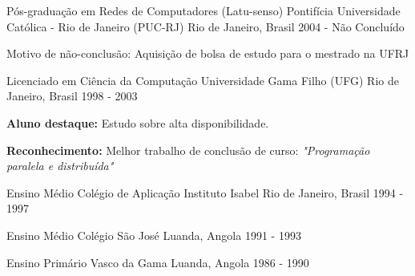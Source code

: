 \begin{cventries}

\cventry
{Pós-graduação em Redes de Computadores (Latu-senso)} %
{Pontifícia Universidade Católica - Rio de Janeiro (PUC-RJ)} %
{Rio de Janeiro, Brasil} %
{2004 - Não Concluído} %
{ %
\begin{cvitems}
    \item {Motivo de não-conclusão: Aquisição de bolsa de estudo para o mestrado na UFRJ}
\end{cvitems}
}


\cventry
{Licenciado em Ciência da Computação} %
{Universidade Gama Filho (UFG)} %
{Rio de Janeiro, Brasil} %
{1998 - 2003} %
{ %
\begin{cvitems}
    \item \textbf{Aluno destaque:} Estudo sobre alta disponibilidade.
    \item \textbf{Reconhecimento:} Melhor trabalho de conclusão de curso: \textit{"Programação paralela e distribuída"}
\end{cvitems}
}


\cventry
{Ensino Médio} %
{Colégio de Aplicação Instituto Isabel} %
{Rio de Janeiro, Brasil} %
{1994 - 1997} %
{ %
}


\cventry
{Ensino Médio} %
{Colégio São José} %
{Luanda, Angola} %
{1991 - 1993} %
{ %
}


\cventry
{Ensino Primário} %
{Vasco da Gama} %
{Luanda, Angola} %
{1986 - 1990} %
{ %
}


\end{cventries}
